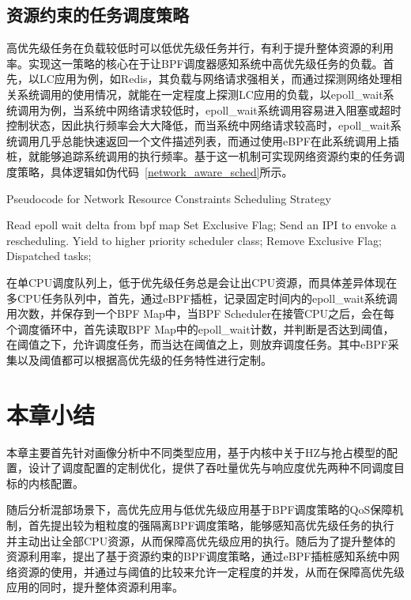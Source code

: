 \subsection{资源约束的任务调度策略}


高优先级任务在负载较低时可以低优先级任务并行，有利于提升整体资源的利用率。实现这一策略的核心在于让BPF调度器感知系统中高优先级任务的负载。首先，以LC应用为例，如Redis，其负载与网络请求强相关，而通过探测网络处理相关系统调用的使用情况，就能在一定程度上探测LC应用的负载，以epoll\_wait系统调用为例，当系统中网络请求较低时，epoll\_wait系统调用容易进入阻塞或超时控制状态，因此执行频率会大大降低，而当系统中网络请求较高时，epoll\_wait系统调用几乎总能快速返回一个文件描述列表，而通过使用eBPF在此系统调用上插桩，就能够追踪系统调用的执行频率。基于这一机制可实现网络资源约束的任务调度策略，具体逻辑如伪代码~\ref{network_aware_sched}所示。

\begin{algorithm}
    \caption{Pseudocode for Network Resource Constraints Scheduling Strategy}
    \label{alg:network_aware_sched}
    \begin{algorithmic}[1]
        \State Read epoll wait delta from bpf map
            \State Set Exclusive Flag;
                \State Send an IPI to envoke a rescheduling.
            \EndFor
            \State Yield to higher priority scheduler class;
        \EndIf
        \State Remove Exclusive Flag;
        \State Dispatched tasks;
    \EndWhile
    \end{algorithmic}
\end{algorithm}

在单CPU调度队列上，低于优先级任务总是会让出CPU资源，而具体差异体现在多CPU任务队列中，首先，通过eBPF插桩，记录固定时间内的epoll\_wait系统调用次数，并保存到一个BPF Map中，当BPF Scheduler在接管CPU之后，会在每个调度循环中，首先读取BPF Map中的epoll\_wait计数，并判断是否达到阈值，在阈值之下，允许调度任务，而当达在阈值之上，则放弃调度任务。其中eBPF采集以及阈值都可以根据高优先级的任务特性进行定制。


\section{本章小结}

本章主要首先针对画像分析中不同类型应用，基于内核中关于HZ与抢占模型的配置，设计了调度配置的定制优化，提供了吞吐量优先与响应度优先两种不同调度目标的内核配置。

随后分析混部场景下，高优先应用与低优先级应用基于BPF调度策略的QoS保障机制，首先提出较为粗粒度的强隔离BPF调度策略，能够感知高优先级任务的执行并主动出让全部CPU资源，从而保障高优先级应用的执行。随后为了提升整体的资源利用率，提出了基于资源约束的BPF调度策略，通过eBPF插桩感知系统中网络资源的使用，并通过与阈值的比较来允许一定程度的并发，从而在保障高优先级应用的同时，提升整体资源利用率。